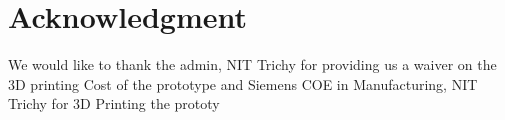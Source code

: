 \section*{Acknowledgment}


We would like to thank the admin, NIT Trichy for providing us a waiver on the 3D printing Cost of the prototype and Siemens COE in Manufacturing, NIT Trichy for 3D Printing the prototy
